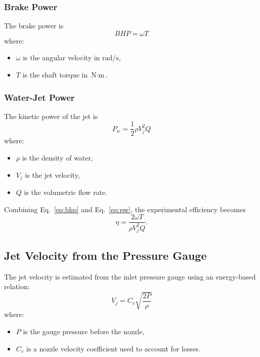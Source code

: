 \documentclass[12pt,letterpaper]{article}
\begin{document}
\subsubsection*{Brake Power}
The brake power is
\begin{equation}
BHP = \omega T
\label{eq:bhp}
\end{equation}
where:
\begin{itemize}[leftmargin=*]
    \item \(\omega\) is the angular velocity in \(\text{rad/s}\),
    \item \(T\) is the shaft torque in \(\text{N}\cdot\text{m}\).
\end{itemize}

\subsubsection*{Water-Jet Power}
The kinetic power of the jet is
\begin{equation}
P_w = \frac{1}{2}\rho V_j^2 Q
\label{eq:pw}
\end{equation}
where:
\begin{itemize}[leftmargin=*]
    \item \(\rho\) is the density of water,
    \item \(V_j\) is the jet velocity,
    \item \(Q\) is the volumetric flow rate.
\end{itemize}

Combining Eq.~\eqref{eq:bhp} and Eq.~\eqref{eq:pw}, the experimental efficiency becomes
\begin{equation}
\eta = \frac{2\omega T}{\rho V_j^2 Q}.
\label{eq:etaexp}
\end{equation}

\subsection{Jet Velocity from the Pressure Gauge}
The jet velocity is estimated from the inlet pressure gauge using an energy-based relation:
\begin{equation}
V_j = C_v \sqrt{\frac{2P}{\rho}}
\label{eq:vj}
\end{equation}
where:
\begin{itemize}[leftmargin=*]
    \item \(P\) is the gauge pressure before the nozzle,
    \item \(C_v\) is a nozzle velocity coefficient used to account for losses.
\end{itemize}
\end{document}
